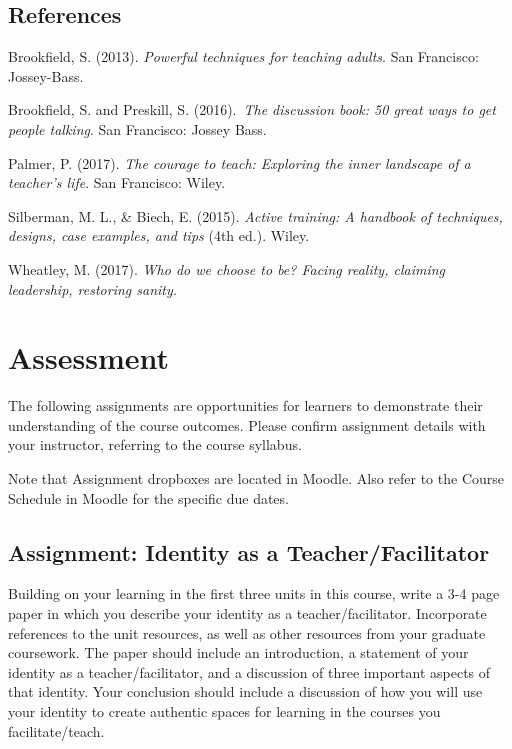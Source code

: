 \documentclass[
]{book}
\begin{document}
\hypertarget{references-5}{%
\section*{References}\label{references-5}}

Brookfield, S. (2013). \emph{Powerful techniques for teaching adults}. San Francisco: Jossey-Bass.

Brookfield, S. and Preskill, S. (2016).~\emph{The discussion book: 50 great ways to get people talking}. San Francisco: Jossey Bass. ~

Palmer, P. (2017). \emph{The courage to teach: Exploring the inner landscape of a teacher's life}. San Francisco: Wiley.

Silberman, M. L., \& Biech, E. (2015). \emph{Active training: A handbook of techniques, designs, case examples, and tips} (4th ed.). Wiley.

Wheatley, M. (2017). \emph{Who do we choose to be? Facing reality, claiming leadership, restoring sanity. }

\hypertarget{assessment-10}{%
\chapter*{Assessment}\label{assessment-10}}

The following assignments are opportunities for learners to demonstrate their understanding of the course outcomes. Please confirm assignment details with your instructor, referring to the course syllabus.

Note that Assignment dropboxes are located in Moodle. Also refer to the Course Schedule in Moodle for the specific due dates.

\hypertarget{assignment-identity-as-a-teacherfacilitator}{%
\section*{Assignment: Identity as a Teacher/Facilitator}\label{assignment-identity-as-a-teacherfacilitator}}

\begin{assessment}
Building on your learning in the first three units in this course, write
a 3-4 page paper in which you describe your identity as a
teacher/facilitator. Incorporate references to the unit resources, as
well as other resources from your graduate coursework. The paper should
include an introduction, a statement of your identity as a
teacher/facilitator, and a discussion of three important aspects of that
identity. Your conclusion should include a discussion of how you will
use your identity to create authentic spaces for learning in the courses
you facilitate/teach.
\end{assessment}
\end{document}
